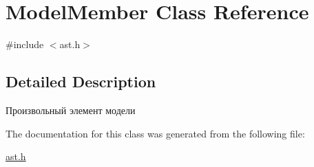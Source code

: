 \hypertarget{classModelMember}{}\section{Model\+Member Class Reference}
\label{classModelMember}


{\ttfamily \#include $<$ast.\+h$>$}



\subsection{Detailed Description}
Произвольный элемент модели 

The documentation for this class was generated from the following file\+:\begin{DoxyCompactItemize}
\item 
\hyperlink{ast_8h}{ast.\+h}\end{DoxyCompactItemize}

